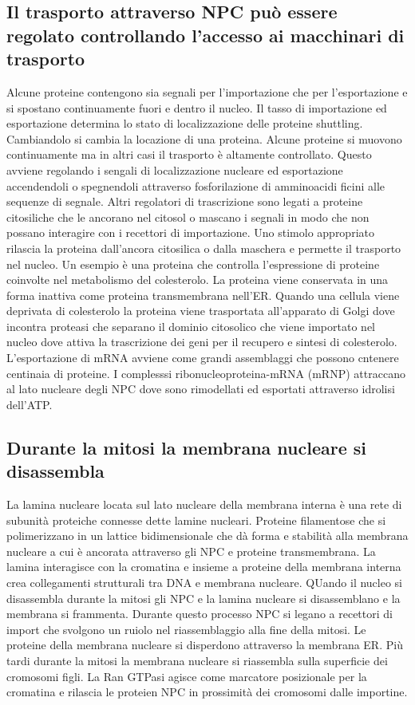 \subsection{Il trasporto attraverso NPC pu\`o essere regolato controllando l'accesso ai macchinari di trasporto}
Alcune proteine contengono sia segnali per l'importazione che per l'esportazione e si spostano continuamente fuori e dentro il nucleo. Il tasso di importazione ed esportazione determina
lo stato di localizzazione delle proteine shuttling. Cambiandolo si cambia la locazione di una proteina. Alcune proteine si muovono continuamente ma in altri casi il trasporto \`e
altamente controllato. Questo avviene regolando i sengali di localizzazione nucleare ed esportazione accendendoli o spegnendoli attraverso fosforilazione di amminoacidi ficini alle
sequenze di segnale. Altri regolatori di trascrizione sono legati a proteine citosiliche che le ancorano nel citosol o mascano i segnali in modo che non possano interagire con i 
recettori di importazione. Uno stimolo appropriato rilascia la proteina dall'ancora citosilica o dalla maschera e permette il trasporto nel nucleo. Un esempio \`e una proteina che 
controlla l'espressione di proteine coinvolte nel metabolismo del colesterolo. La proteina viene conservata in una forma inattiva come proteina transmembrana nell'ER. Quando una 
cellula viene deprivata di colesterolo la proteina viene trasportata all'apparato di Golgi dove incontra proteasi che separano il dominio citosolico che viene importato nel nucleo dove
attiva la trascrizione dei geni per il recupero e sintesi di colesterolo. L'esportazione di mRNA avviene come grandi assemblaggi che possono cntenere centinaia di proteine. I 
complesssi ribonucleoproteina-mRNA (mRNP) attraccano al lato nucleare degli NPC dove sono rimodellati ed esportati attraverso idrolisi dell'ATP. 
\subsection{Durante la mitosi la membrana nucleare si disassembla}
La lamina nucleare locata sul lato nucleare della membrana interna \`e una rete di subunit\`a proteiche connesse dette lamine nucleari. Proteine filamentose che si polimerizzano in
un lattice bidimensionale che d\`a forma e stabilit\`a alla membrana nucleare a cui \`e ancorata attraverso gli NPC e proteine transmembrana. La lamina interagisce con la cromatina e
insieme a proteine della membrana interna crea collegamenti strutturali tra DNA e membrana nucleare. QUando il nucleo si disassembla durante la mitosi gli NPC e la lamina nucleare si 
disassemblano e la membrana si frammenta. Durante questo processo NPC si legano a recettori di import che svolgono un ruiolo nel riassemblaggio alla fine della mitosi. Le proteine della
membrana nucleare si disperdono attraverso la membrana ER. Pi\`u tardi durante la mitosi la membrana nucleare si riassembla sulla superficie dei cromosomi figli. La Ran GTPasi 
agisce come marcatore posizionale per la cromatina e rilascia le proteien NPC in prossimit\`a dei cromosomi dalle importine. 
